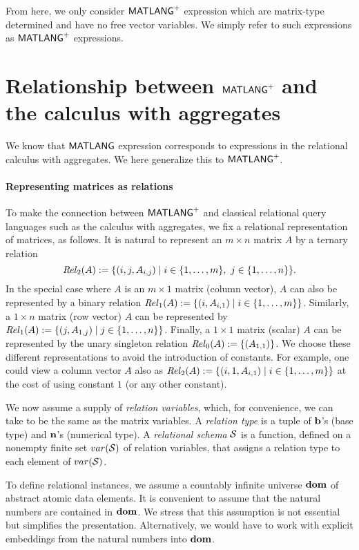 From here, we only consider $\mathsf{MATLANG}^{\sf +}$ expression which are matrix-type determined and have no free vector variables. We simply
refer to such expressions as $\mathsf{MATLANG}^{\sf +}$ expressions.


\section{Relationship between $\mathsf{MATLANG}^{\sf +}$ and the calculus with aggregates}
We know that $\mathsf{MATLANG}$ expression corresponds to expressions in the relational calculus with aggregates. We here generalize this to $\mathsf{MATLANG}^{\sf +}$.

\paragraph{Representing matrices as relations}
To make the connection between $\mathsf{MATLANG}^{\sf +}$ and classical relational query languages such as the calculus with aggregates, we fix a relational representation of matrices, as follows. It is natural to represent an $m \times n$ matrix $A$
by a ternary relation $$
\mathit{Rel}_2(A) := \{(i,j,A_{i,j}) \mid i \in \{1,\dots,m\}, \ j \in
\{1,\dots,n\}\}. $$  In the special case where $A$ is an
$m \times 1$ matrix (column
vector), $A$ can also be represented by a binary relation
$\mathit{Rel}_1(A) :=
\{(i,A_{i,1}) \mid i \in \{1,\dots,m\}\}$.  Similarly, a $1
\times n$ matrix (row vector) $A$ can be represented by $\mathit{Rel}_1(A)
:= \{(j,A_{1,j}) \mid j \in \{1,\dots,n\}\}$.  Finally, a $1
\times 1$ matrix (scalar) $A$ can be represented by the unary
singleton relation $\mathit{Rel}_0(A) := \{(A_{1,1})\}$. We choose these different representations to avoid the introduction of constants. For example, one could view a column vector $A$ also as  $\mathit{Rel}_2(A) := \{(i,1,A_{i,1}) \mid i \in \{1,\dots,m\}\} $ at the cost of using constant $1$ (or any other constant). 

We now assume a supply of \emph{relation variables}, which, for
convenience, we can take to be the same as the matrix variables.
A \emph{relation type} is a tuple of $\mathbf{b}$'s (base type) and $\mathbf{n}$'s (numerical type).
A \emph{relational schema} $\mathcal{S}$ is a function, defined on a
nonempty finite set
$var(\mathcal{S})$ of relation variables, that assigns a relation type
to each element of $var(\mathcal{S})$.

To define relational instances, we assume a countably infinite universe
$\mathbf{dom}$ of abstract atomic data elements.  It is convenient to
assume that the natural numbers are contained in $\mathbf{dom}$.  We
stress that this assumption is not essential but simplifies the
presentation.  Alternatively, we would have to work with explicit
embeddings from the natural numbers into $\mathbf{dom}$.

